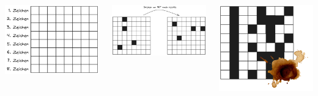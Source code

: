 \documentclass{beamer}
\begin{document}
\begin{frame}[t]
	\begin{columns}
		\begin{column}{0.3\textwidth}
			\includegraphics[width=\textwidth]{./b6code-struktur.excalidraw.png}
		\end{column}
		\begin{column}{0.3\textwidth}
			\includegraphics[width=\textwidth]{./b6code-drehen.excalidraw.png}
		\end{column}
		\begin{column}{0.3\textwidth}
			\includegraphics[width=\textwidth]{./b6code-fehler.excalidraw.png}

\end{column}
\end{columns}
\end{frame}
\end{document}
